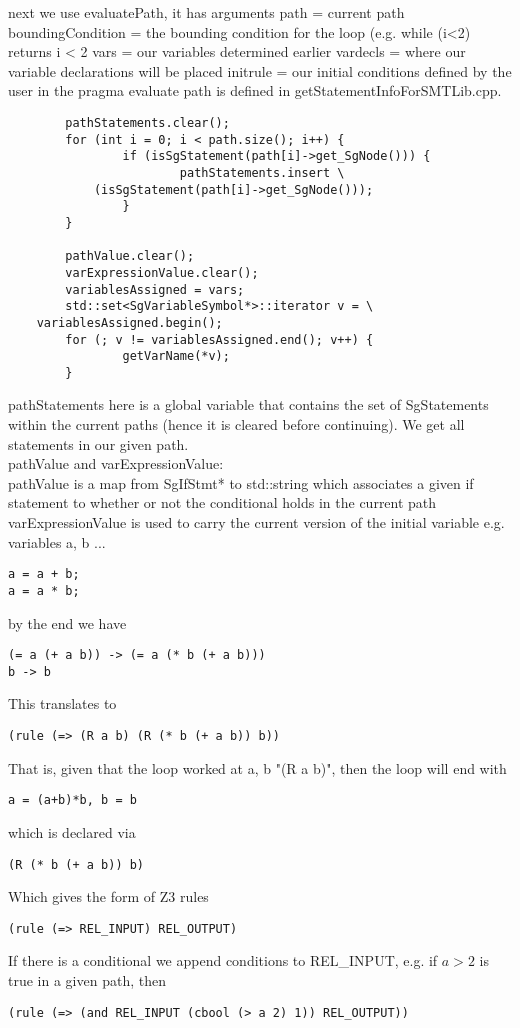 \documentclass[11pt]{article}
\begin{document}
next we use evaluatePath, it has arguments
path = current path
boundingCondition = the bounding condition for the loop (e.g. while (i<2) returns i < 2
vars = our variables determined earlier
vardecls = where our variable declarations will be placed
initrule = our initial conditions defined by the user in the pragma
evaluate path is defined in getStatementInfoForSMTLib.cpp.
\begin{lstlisting}
        pathStatements.clear();
        for (int i = 0; i < path.size(); i++) {
                if (isSgStatement(path[i]->get_SgNode())) {
                        pathStatements.insert \
			(isSgStatement(path[i]->get_SgNode()));
                }
        }

        pathValue.clear();
        varExpressionValue.clear();
        variablesAssigned = vars;
        std::set<SgVariableSymbol*>::iterator v = \
	variablesAssigned.begin();
        for (; v != variablesAssigned.end(); v++) {
                getVarName(*v);
        }
\end{lstlisting}
pathStatements here is a global variable that contains the set of SgStatements within the current paths (hence it is cleared before continuing). We get all statements in our given path.\\
pathValue and varExpressionValue:\\
pathValue is a map from SgIfStmt* to std::string which associates a given if statement to whether or not the conditional holds in the current path\\
varExpressionValue is used to carry the current version of the initial variable e.g.
variables a, b ...\\
\begin{lstlisting}
a = a + b;
a = a * b;
\end{lstlisting}
by the end we have
\begin{verbatim}
(= a (+ a b)) -> (= a (* b (+ a b)))
b -> b
\end{verbatim}
This translates to\\
\begin{verbatim}
(rule (=> (R a b) (R (* b (+ a b)) b))
\end{verbatim}
That is, given that the loop worked at a, b "(R a b)", then the loop will
end with 
\begin{verbatim}
a = (a+b)*b, b = b
\end{verbatim}
which is declared via\\
\begin{verbatim}
(R (* b (+ a b)) b)
\end{verbatim}
Which gives the form of Z3 rules\\
\begin{verbatim}
(rule (=> REL_INPUT) REL_OUTPUT)
\end{verbatim}
If there is a conditional we append conditions to REL\_INPUT, e.g. if $a > 2$ is true in a given path, then\\
\begin{verbatim}
(rule (=> (and REL_INPUT (cbool (> a 2) 1)) REL_OUTPUT))
\end{verbatim}
\end{document}
